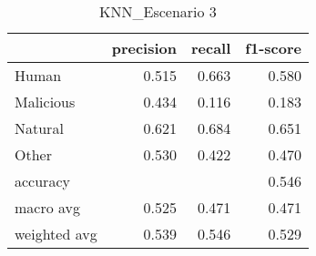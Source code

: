 \begin{table}
\centering
\caption{KNN_Escenario 3}
\label{tab:Reporte de clasificación para el Escenario 3 utilizando KNN}
\begin{tabular}{lrrr}
\toprule
{} &  precision &  recall &  f1-score \\
\midrule
Human        &      0.515 &   0.663 &     0.580 \\
Malicious    &      0.434 &   0.116 &     0.183 \\
Natural      &      0.621 &   0.684 &     0.651 \\
Other        &      0.530 &   0.422 &     0.470 \\
accuracy     &            &         &     0.546 \\
macro avg    &      0.525 &   0.471 &     0.471 \\
weighted avg &      0.539 &   0.546 &     0.529 \\
\bottomrule
\end{tabular}
\end{table}
